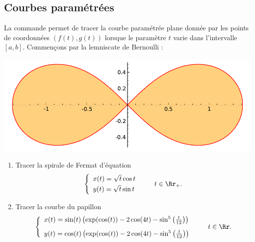 \documentclass[class=report,crop=false]{standalone}
\begin{document}
\subsection{Courbes paramétrées}

La commande  
permet de tracer la courbe paramétrée plane donnée par les points 
de coordonnées $(f(t), g(t))$ lorsque le paramètre $t$ varie 
dans l'intervalle $[a,b]$. 
Commençons par la lemniscate de Bernoulli :


\begin{center}
 \includegraphics[scale=0.7]{figures/lemniscate_bernoulli} 
\end{center}






\begin{tp}
\sauteligne
\begin{enumerate}
  \item Tracer la spirale de Fermat d'équation
  $$\left\{
\begin{array}{l}
x(t)=\sqrt t \cos t\\[1mm]
y(t)=\sqrt t \sin t
\end{array}
\right. \qquad t \in \Rr_+.$$
  \item Tracer la courbe du papillon
  $$\left\{
\begin{array}{l}
x(t) = \sin(t)\left(\exp(\cos(t))-2\cos(4t)-\sin^5\left(\frac{t}{12}\right)\right)\\[3mm]
y(t) = \cos(t)\left(\exp(\cos(t))-2\cos(4t)-\sin^5\left(\frac{t}{12}\right)\right)
\end{array}
\right. \qquad t \in \Rr.$$
\end{enumerate} 
\end{tp}
\end{document}
